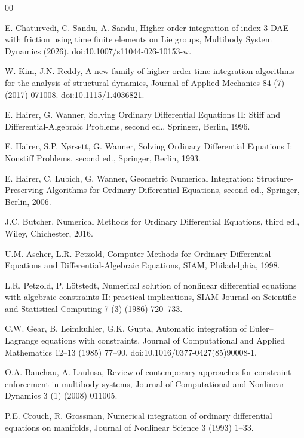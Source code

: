 \begin{thebibliography}{00}

E. Chaturvedi, C. Sandu, A. Sandu,
Higher-order integration of index-3 DAE with friction using time finite elements on Lie groups,
Multibody System Dynamics (2026).
doi:10.1007/s11044-026-10153-w.

W. Kim, J.N. Reddy,
A new family of higher-order time integration algorithms for the analysis of structural dynamics,
Journal of Applied Mechanics 84 (7) (2017) 071008.
doi:10.1115/1.4036821.

E. Hairer, G. Wanner,
Solving Ordinary Differential Equations II: Stiff and Differential-Algebraic Problems,
second ed., Springer, Berlin, 1996.

E. Hairer, S.P. N{\o}rsett, G. Wanner,
Solving Ordinary Differential Equations I: Nonstiff Problems,
second ed., Springer, Berlin, 1993.

E. Hairer, C. Lubich, G. Wanner,
Geometric Numerical Integration: Structure-Preserving Algorithms for Ordinary Differential
Equations, second ed., Springer, Berlin, 2006.

J.C. Butcher,
Numerical Methods for Ordinary Differential Equations, third ed., Wiley, Chichester, 2016.

U.M. Ascher, L.R. Petzold,
Computer Methods for Ordinary Differential Equations and Differential-Algebraic Equations,
SIAM, Philadelphia, 1998.

L.R. Petzold, P. L\"otstedt,
Numerical solution of nonlinear differential equations with algebraic constraints II: practical
implications,
SIAM Journal on Scientific and Statistical Computing 7 (3) (1986) 720--733.

C.W. Gear, B. Leimkuhler, G.K. Gupta,
Automatic integration of Euler--Lagrange equations with constraints,
Journal of Computational and Applied Mathematics 12--13 (1985) 77--90.
doi:10.1016/0377-0427(85)90008-1.

O.A. Bauchau, A. Laulusa,
Review of contemporary approaches for constraint enforcement in multibody systems,
Journal of Computational and Nonlinear Dynamics 3 (1) (2008) 011005.

P.E. Crouch, R. Grossman,
Numerical integration of ordinary differential equations on manifolds,
Journal of Nonlinear Science 3 (1993) 1--33.


\end{thebibliography}
